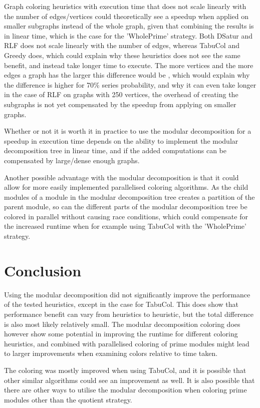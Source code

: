 \documentclass[a4paper]{article}
\begin{document}
Graph coloring heuristics with execution time that does not scale linearly with
the number of edges/vertices could theoretically see a speedup when applied 
on smaller subgraphs instead of the whole graph, given that
combining the results is in linear time, which is the case for the
'WholePrime' strategy. Both DSatur and RLF does not scale linearly with the
number of edges, whereas TabuCol and Greedy does, which could explain why these
heuristics does not see the same benefit, and instead take longer time to execute. 
The more vertices and the more edges a graph has the larger this difference would be 
, which would explain why the difference is higher for 70\% series probability, and why 
it can even take longer in the case of RLF on graphs with 250 vertices, the overhead of
creating the subgraphs is not yet compensated by the speedup from applying on smaller graphs.


Whether or not it is worth it in practice to use the modular decomposition
for a speedup in execution time depends on the ability to implement the modular
decomposition tree in linear time, and if the added computations can be
compensated by large/dense enough graphs.


Another possible advantage with the modular decomposition is that it could
allow for more easily implemented parallelised coloring algorithms. As the
child modules of a module in the modular decomposition tree creates a partition
of the parent module, so can the different parts of the modular decomposition
tree be colored in parallel without causing race conditions, which could compensate for the increased runtime
when for example using TabuCol with the 'WholePrime' strategy.

\section{Conclusion}

Using the modular decomposition did not significantly improve the performance of
the tested heuristics, except in the case for TabuCol. This does show that
performance benefit can vary from heuristics to heuristic, but the total
difference is also most likely relatively small. The modular decomposition
coloring does however show some potential in improving the runtime for
different coloring heuristics, and combined with parallelised coloring of prime
modules might lead to larger improvements when examining colors relative to
time taken.

The coloring was mostly improved when using TabuCol, and it is possible that
other similar algorithms could see an improvement as well. It is also possible
that there are other ways to utilise the modular decomposition when coloring
prime modules other than the quotient strategy.
\end{document}
